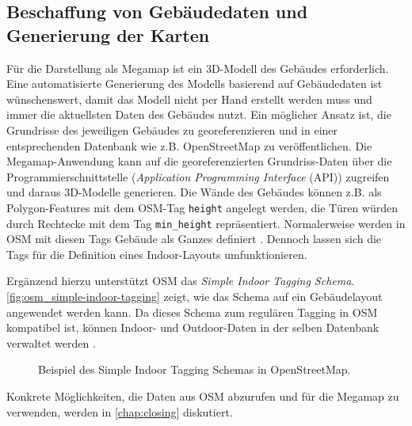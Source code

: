 \subsection{Beschaffung von Gebäudedaten und Generierung der Karten}
Für die Darstellung als Megamap ist ein 3D-Modell des Gebäudes erforderlich.
Eine automatisierte Generierung des Modells basierend auf Gebäudedaten ist wünschenswert, damit das Modell nicht per Hand erstellt werden muss und immer die aktuellsten Daten des Gebäudes nutzt.
Ein möglicher Ansatz ist, die Grundrisse des jeweiligen Gebäudes zu georeferenzieren und in einer entsprechenden Datenbank wie z.B. OpenStreetMap zu veröffentlichen.
Die Megamap-Anwendung kann auf die georeferenzierten Grundriss-Daten über die Programmierschnittstelle (\emph{Application Programming Interface} (API)) zugreifen und daraus 3D-Modelle generieren.
Die Wände des Gebäudes können z.B. als Polygon-Features mit dem OSM-Tag \lstinline{height} angelegt werden, die Türen würden durch Rechtecke mit dem Tag \lstinline{min_height} repräsentiert.
Normalerweise werden in OSM mit diesen Tags Gebäude als Ganzes definiert \parencite{OpenStreetMapFoundation2018b}.
Dennoch lassen sich die Tags für die Definition eines Indoor-Layouts umfunktionieren.

Ergänzend hierzu unterstützt OSM das \emph{Simple Indoor Tagging Schema}.
\autoref{fig:osm_simple-indoor-tagging} zeigt, wie das Schema auf ein Gebäudelayout angewendet werden kann.
Da dieses Schema zum regulären Tagging in OSM kompatibel ist, können Indoor- und Outdoor-Daten in der selben Datenbank verwaltet werden \parencite{OpenStreetMapFoundation2018c}.
\begin{figure}[t]
    \centering
    \caption{Beispiel des Simple Indoor Tagging Schemas in OpenStreetMap. %
    }
    \label{fig:osm_simple-indoor-tagging}
\end{figure}

Konkrete Möglichkeiten, die Daten aus OSM abzurufen und für die Megamap zu verwenden, werden in \autoref{chap:closing} diskutiert.
%
\cleardoublepage
